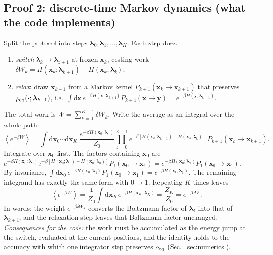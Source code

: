 \documentclass[11pt,a4paper]{article}
\newcommand{\dd}{\mathrm{d}}
\newcommand{\avg}[1]{\left\langle #1\right\rangle}
\newcommand{\lam}{\bm{\lambda}}
\begin{document}
\subsection{Proof 2: discrete-time Markov dynamics (what the code implements)}
Split the protocol into steps $\lam_0,\lam_1,\dots,\lam_K$. Each step does:
\begin{enumerate}[leftmargin=*,itemsep=0pt]
\item \emph{switch} $\lam_k\to\lam_{k+1}$ at frozen $\bm x_k$, costing work $\delta W_k=H(\bm x_k;\lam_{k+1})-H(\bm x_k;\lam_k)$;
\item \emph{relax}: draw $\bm x_{k+1}$ from a Markov kernel $P_{k+1}(\bm x_k\to\bm x_{k+1})$ that preserves
$\rho_{\rm eq}(\cdot;\lam_{k+1})$, i.e.\ $\int\dd\bm x\,e^{-\beta H(\bm x;\lam_{k+1})}P_{k+1}(\bm x\to\bm y)=e^{-\beta H(\bm y;\lam_{k+1})}$.
\end{enumerate}
The total work is $W=\sum_{k=0}^{K-1}\delta W_k$. Write the average as an integral over the whole path:
\begin{equation}
\avg{e^{-\beta W}}=\int\dd\bm x_0\cdots\dd\bm x_K\;\frac{e^{-\beta H(\bm x_0;\lam_0)}}{Z_0}
\prod_{k=0}^{K-1}e^{-\beta[H(\bm x_k;\lam_{k+1})-H(\bm x_k;\lam_k)]}\,P_{k+1}(\bm x_k\to\bm x_{k+1}).
\end{equation}
Integrate over $\bm x_0$ first. The factors containing $\bm x_0$ are
$e^{-\beta H(\bm x_0;\lam_0)}e^{-\beta[H(\bm x_0;\lam_1)-H(\bm x_0;\lam_0)]}P_1(\bm x_0\to\bm x_1)
=e^{-\beta H(\bm x_0;\lam_1)}P_1(\bm x_0\to\bm x_1)$. By invariance,
$\int\dd\bm x_0\,e^{-\beta H(\bm x_0;\lam_1)}P_1(\bm x_0\to\bm x_1)=e^{-\beta H(\bm x_1;\lam_1)}$. The
remaining integrand has exactly the same form with $0\to1$. Repeating $K$ times leaves
\begin{equation}
\avg{e^{-\beta W}}=\frac1{Z_0}\int\dd\bm x_K\,e^{-\beta H(\bm x_K;\lam_K)}=\frac{Z_K}{Z_0}=e^{-\beta\Delta F}.
\end{equation}
In words: the weight $e^{-\beta\delta W_k}$ converts the Boltzmann factor of $\lam_k$ into that of
$\lam_{k+1}$, and the relaxation step leaves that Boltzmann factor unchanged. \emph{Consequences for
the code:} the work must be accumulated as the energy jump at the switch, evaluated at the current
positions, and the identity holds to the accuracy with which one integrator step preserves
$\rho_{\rm eq}$ (Sec.~\ref{sec:numerics}).
\end{document}
